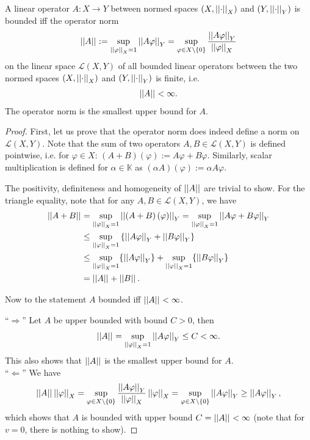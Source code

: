 \begin{theorem}
	A linear operator $A: X\to Y$ between normed spaces $(X, \norm{\cdot}{X})$ and $(Y, \norm{\cdot}{Y})$ is bounded iff the operator norm
	\begin{align}
		\norm{A}{} := \sup_{\norm{\varphi}{X} = 1}\norm{A\varphi}{Y} = \sup_{\varphi\in X\backslash \{0\}}\frac{\norm{A\varphi}{Y}}{\norm{\varphi}{X}}
	\end{align}
	on the linear space $\mathcal L(X, Y)$ of all bounded linear operators between the two normed spaces $(X, \norm{\cdot}{X})$ and $(Y, \norm{\cdot}{Y})$ is finite, i.e. 
	\begin{align}
		\norm{A}{} < \infty. 
	\end{align} 
	The operator norm is the smallest upper bound for $A$.
\end{theorem}

\begin{proof}
	First, let us prove that the operator norm does indeed define a norm on $\mathcal L(X, Y)$. Note that the sum of two operators $A, B\in\mathcal L(X, Y)$ is defined pointwise, i.e. for $\varphi\in X$: $\left(A + B\right)(\varphi) := A\varphi + B\varphi$. Similarly, scalar multiplication is defined for $\alpha \in \mathbb K$ as $\left(\alpha A\right)(\varphi) := \alpha A\varphi$.
	
	The positivity, definiteness and homogeneity of $\norm{A}{}$ are trivial to show. For the triangle equality, note that for any $A, B\in\mathcal L(X, Y)$, we have
	\begin{align}
		\norm{A + B}{} &= \sup_{\norm{\varphi}{X} = 1}\norm{\left(A + B\right)(\varphi)}{Y} = \sup_{\norm{\varphi}{X} = 1}\norm{A\varphi + B\varphi}{Y}
		\\ &\leq \sup_{\norm{\varphi}{X} = 1} \left\{\norm{A\varphi}{Y} + \norm{B\varphi}{Y}\right\} 
		\\ &\leq \sup_{\norm{\varphi}{X} = 1}\{ \norm{A\varphi}{Y} \} + \sup_{\norm{\varphi}{X} = 1}\{ \norm{B\varphi}{Y} \} 
		\\ &= \norm{A}{} + \norm{B}{}.
	\end{align}
	
	Now to the statement $A$ bounded iff $\norm{A}{} < \infty$.
	
	\enquote{$\Longrightarrow$} Let $A$ be upper bounded with bound $C > 0$, then
	\begin{align}
		\norm{A}{} = \sup_{\norm{\varphi}{X} = 1}\norm{A\varphi}{Y} \leq C < \infty.
	\end{align}
	This also shows that $\norm{A}{}$ is the smallest upper bound for $A$.
	\\
	
	\enquote{$\Longleftarrow$} We have 
	\begin{align}
		\norm{A}{} \norm{\varphi}{X} = \sup_{\varphi\in X\backslash \{0\}}\frac{\norm{A\varphi}{Y}}{\norm{\varphi}{X}} \norm{\varphi}{X} = \sup_{\varphi\in X\backslash \{0\}}\norm{A\varphi}{Y} \geq \norm{A\varphi}{Y},
	\end{align}
	which shows that $A$ is bounded with upper bound $C = \norm{A}{} < \infty$ (note that for $v = 0$, there is nothing to show).
\end{proof}

